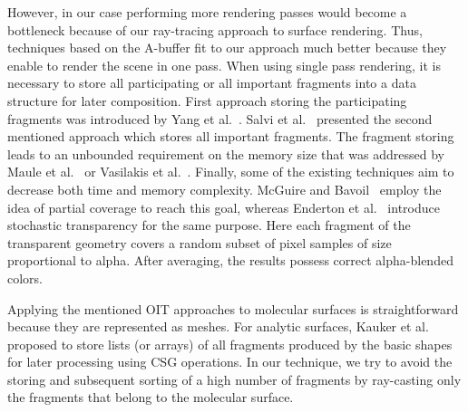 However, in our case performing more rendering passes would become a bottleneck because of our ray-tracing approach to surface rendering.
Thus, techniques based on the A-buffer fit to our approach much better because they enable to render the scene in one pass.
When using single pass rendering, it is necessary to store all participating or all important fragments into a data structure for later composition.
First approach storing the participating fragments was introduced by Yang et al.~\cite{yang2010real}. Salvi et al.~\cite{salvi2011adaptive} presented the second mentioned approach which stores all important fragments.
The fragment storing leads to an unbounded requirement on the memory size that was addressed by Maule et al.~\cite{maule2012memory} or Vasilakis et al.~\cite{vasilakis2015k+buffer}.
Finally, some of the existing techniques aim to decrease both time and memory complexity.
McGuire and Bavoil~\cite{mcguire2013weighted} employ the idea of partial coverage to reach this goal, whereas Enderton et al.~\cite{enderton2011stochastic} introduce stochastic transparency for the same purpose. 
Here each fragment of the transparent geometry covers a random subset of pixel samples of size proportional to alpha. 
After averaging, the results possess correct alpha-blended colors. 

Applying the mentioned OIT approaches to molecular surfaces is straightforward because they are represented as meshes.
For analytic surfaces, Kauker et al.~\cite{kauker2013rendering} proposed to store lists (or arrays) of all fragments produced by the basic shapes for later processing using CSG operations.
In our technique, we try to avoid the storing and subsequent sorting of a high number of fragments by ray-casting only the fragments that belong to the molecular surface.



